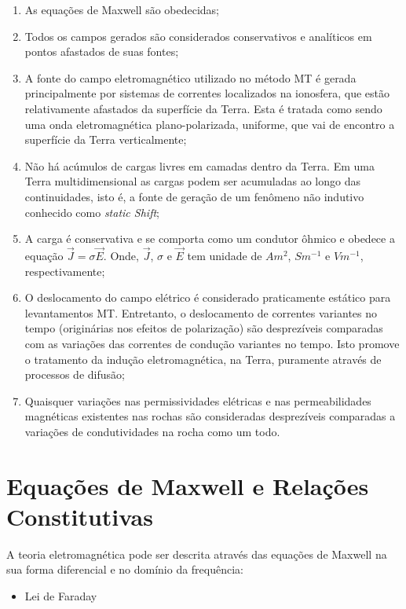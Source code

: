 \begin{enumerate}
	\item As equações de Maxwell são obedecidas;
	
	\item Todos os campos gerados são considerados conservativos e analíticos em pontos afastados de suas fontes;
	
	\item  A fonte do campo eletromagnético utilizado no método MT é gerada principalmente por sistemas de correntes localizados na ionosfera, que estão relativamente afastados da superfície da Terra. Esta é tratada como sendo uma onda eletromagnética plano-polarizada, uniforme, que vai de encontro a superfície da Terra verticalmente;
	
	\item Não há acúmulos de cargas livres  em camadas dentro da Terra. Em uma Terra multidimensional as cargas podem ser acumuladas ao longo das continuidades, isto é, a fonte de geração de um fenômeno não indutivo conhecido como \textit{static Shift};
	
	\item A carga é conservativa e se comporta como um condutor ôhmico e obedece a equação $\vec{J}=\sigma\vec{E}$. Onde, $\vec{J}$, $\sigma$ e $\vec{E}$ tem unidade de $Am^{2}$, $Sm^{-1}$ e $Vm^{-1}$, respectivamente; 
	
	\item O deslocamento do campo elétrico é considerado praticamente estático para levantamentos MT. Entretanto, o deslocamento de correntes variantes no tempo (originárias nos efeitos de polarização) são desprezíveis comparadas com as variações das correntes de condução variantes no tempo. Isto promove o tratamento da indução eletromagnética, na Terra, puramente através de processos de difusão;
	
	\item Quaisquer variações nas permissividades elétricas e nas permeabilidades magnéticas existentes nas rochas são consideradas desprezíveis comparadas a variações de condutividades na rocha como um todo.
\end{enumerate} 


\section{Equações de Maxwell e Relações Constitutivas}

A teoria eletromagnética pode ser descrita através das equações de Maxwell na sua forma diferencial e no domínio da frequência:
\begin{itemize}
\item Lei de Faraday
\end{itemize}

